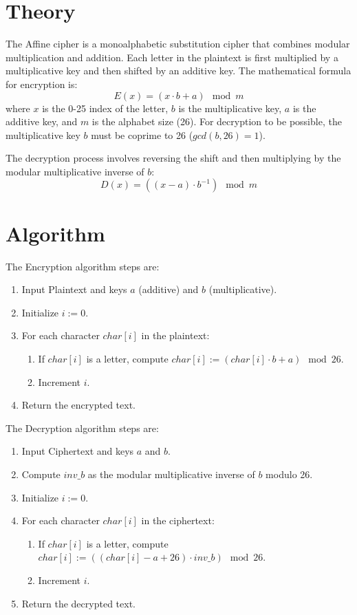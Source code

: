 
\section{Theory}
The Affine cipher is a monoalphabetic substitution cipher that combines modular multiplication and addition. Each letter in the plaintext is first multiplied by a multiplicative key and then shifted by an additive key. The mathematical formula for encryption is:
$$E(x) = (x \cdot b + a) \mod m$$
where $x$ is the 0-25 index of the letter, $b$ is the multiplicative key, $a$ is the additive key, and $m$ is the alphabet size (26). For decryption to be possible, the multiplicative key $b$ must be coprime to 26 ($gcd(b, 26) = 1$).

The decryption process involves reversing the shift and then multiplying by the modular multiplicative inverse of $b$:
$$D(x) = ((x - a) \cdot b^{-1}) \mod m$$

\section{Algorithm}
The Encryption algorithm steps are:
\begin{enumerate}
  \item Input Plaintext and keys $a$ (additive) and $b$ (multiplicative).
  \item Initialize $i := 0$.
  \item For each character $char[i]$ in the plaintext:
  \begin{enumerate}
    \item If $char[i]$ is a letter, compute $char[i] := (char[i] \cdot b + a) \mod 26$.
    \item Increment $i$.
  \end{enumerate}
  \item Return the encrypted text.
\end{enumerate}

The Decryption algorithm steps are:
\begin{enumerate}
  \item Input Ciphertext and keys $a$ and $b$.
  \item Compute $inv\_b$ as the modular multiplicative inverse of $b$ modulo 26.
  \item Initialize $i := 0$.
  \item For each character $char[i]$ in the ciphertext:
  \begin{enumerate}
    \item If $char[i]$ is a letter, compute $char[i] := ((char[i] - a + 26) \cdot inv\_b) \mod 26$.
    \item Increment $i$.
  \end{enumerate}
  \item Return the decrypted text.
\end{enumerate}

